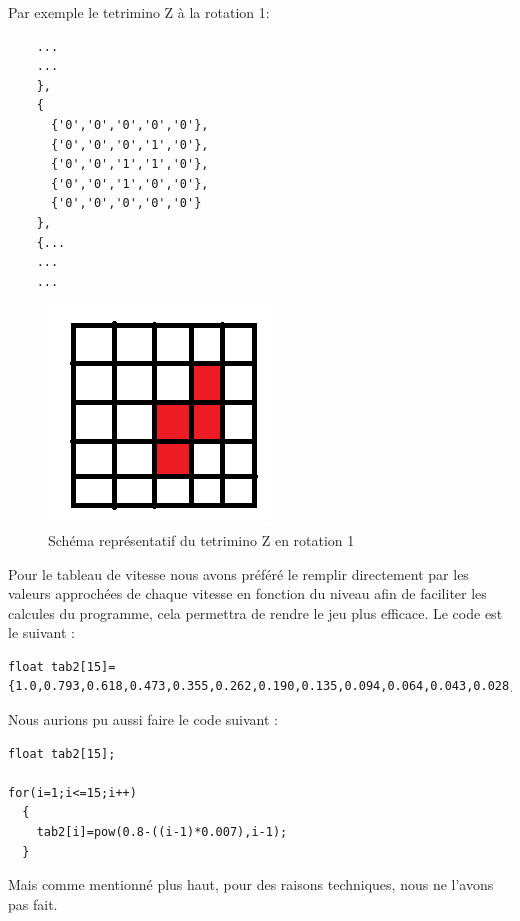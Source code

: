 \documentclass[a4paper,10p]{report}
\begin{document}
\newpage
Par exemple le tetrimino Z à la rotation 1:
\begin{lstlisting}
    ...
    ...
    },
    {
      {'0','0','0','0','0'},
      {'0','0','0','1','0'},
      {'0','0','1','1','0'},
      {'0','0','1','0','0'},
      {'0','0','0','0','0'}
    },
    {...
    ...
    ...
\end{lstlisting}
\begin{figure}[ht]
\includegraphics[scale=1]{dessin4.png}
\caption{\label{dessin1} Schéma représentatif du tetrimino Z en rotation 1}
\end{figure}
Pour le tableau de vitesse nous avons préféré le remplir directement par les valeurs approchées de chaque vitesse en fonction du niveau afin de faciliter les calcules du programme, cela permettra de rendre le jeu plus efficace. Le code est le suivant :
\label{speed}
\begin{lstlisting}
float tab2[15]={1.0,0.793,0.618,0.473,0.355,0.262,0.190,0.135,0.094,0.064,0.043,0.028,0.0018,0.011,0.007};
\end{lstlisting}
Nous aurions pu aussi faire le code suivant :
\begin{lstlisting}
float tab2[15];

for(i=1;i<=15;i++)
  {
    tab2[i]=pow(0.8-((i-1)*0.007),i-1);
  }
\end{lstlisting}
Mais comme mentionné plus haut, pour des raisons techniques, nous ne l'avons pas fait.
\end{document}
